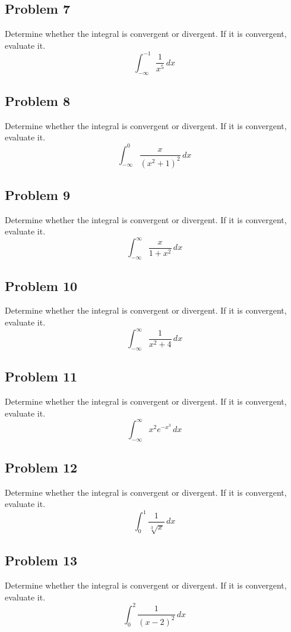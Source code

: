 \documentclass{article}
\begin{document}
\subsection*{Problem 7}
Determine whether the integral is convergent or divergent. If it is convergent, evaluate it.
\[ \int_{-\infty}^{-1} \frac{1}{x^5} \,dx \]

\subsection*{Problem 8}
Determine whether the integral is convergent or divergent. If it is convergent, evaluate it.
\[ \int_{-\infty}^{0} \frac{x}{(x^2+1)^2} \,dx \]

\subsection*{Problem 9}
Determine whether the integral is convergent or divergent. If it is convergent, evaluate it.
\[ \int_{-\infty}^{\infty} \frac{x}{1+x^2} \,dx \]

\subsection*{Problem 10}
Determine whether the integral is convergent or divergent. If it is convergent, evaluate it.
\[ \int_{-\infty}^{\infty} \frac{1}{x^2+4} \,dx \]

\subsection*{Problem 11}
Determine whether the integral is convergent or divergent. If it is convergent, evaluate it.
\[ \int_{-\infty}^{\infty} x^2 e^{-x^3} \,dx \]

\subsection*{Problem 12}
Determine whether the integral is convergent or divergent. If it is convergent, evaluate it.
\[ \int_{0}^{1} \frac{1}{\sqrt[3]{x}} \,dx \]

\subsection*{Problem 13}
Determine whether the integral is convergent or divergent. If it is convergent, evaluate it.
\[ \int_{0}^{2} \frac{1}{(x-2)^2} \,dx \]
\end{document}
